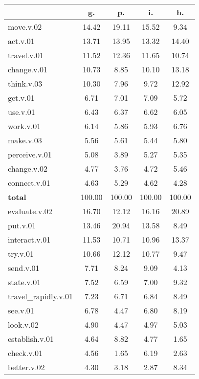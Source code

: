 \begin{table}[h!]
\begin{center}
\begin{tabular}{| l || c | c | c | c |}\hline
 & {\bf g.} & {\bf p.} & {\bf i.} & {\bf h.} \\\hline\hline
move.v.02 & 14.42  & 19.11  & 15.52  & 9.34 \\\hline
act.v.01 & 13.71  & 13.95  & 13.32  & 14.40 \\\hline
travel.v.01 & 11.52  & 12.36  & 11.65  & 10.74 \\\hline
change.v.01 & 10.73  & 8.85  & 10.10  & 13.18 \\\hline
think.v.03 & 10.30  & 7.96  & 9.72  & 12.92 \\\hline
get.v.01 & 6.71  & 7.01  & 7.09  & 5.72 \\\hline
use.v.01 & 6.43  & 6.37  & 6.62  & 6.05 \\\hline
work.v.01 & 6.14  & 5.86  & 5.93  & 6.76 \\\hline
make.v.03 & 5.56  & 5.61  & 5.44  & 5.80 \\\hline
perceive.v.01 & 5.08  & 3.89  & 5.27  & 5.35 \\\hline
change.v.02 & 4.77  & 3.76  & 4.72  & 5.46 \\\hline
connect.v.01 & 4.63  & 5.29  & 4.62  & 4.28 \\\hline\hline
{{\bf total}} & 100.00  & 100.00  & 100.00  & 100.00 \\\hline\hline\hline
evaluate.v.02 & 16.70  & 12.12  & 16.16  & 20.89 \\\hline
put.v.01 & 13.46  & 20.94  & 13.58  & 8.49 \\\hline
interact.v.01 & 11.53  & 10.71  & 10.96  & 13.37 \\\hline
try.v.01 & 10.66  & 12.12  & 10.77  & 9.47 \\\hline
send.v.01 & 7.71  & 8.24  & 9.09  & 4.13 \\\hline
state.v.01 & 7.52  & 6.59  & 7.00  & 9.32 \\\hline
travel\_rapidly.v.01 & 7.23  & 6.71  & 6.84  & 8.49 \\\hline
see.v.01 & 6.78  & 4.47  & 6.80  & 8.19 \\\hline
look.v.02 & 4.90  & 4.47  & 4.97  & 5.03 \\\hline
establish.v.01 & 4.64  & 8.82  & 4.77  & 1.65 \\\hline
check.v.01 & 4.56  & 1.65  & 6.19  & 2.63 \\\hline
better.v.02 & 4.30  & 3.18  & 2.87  & 8.34 \\\hline\hline

\end{tabular}
\end{center}
\end{table}
